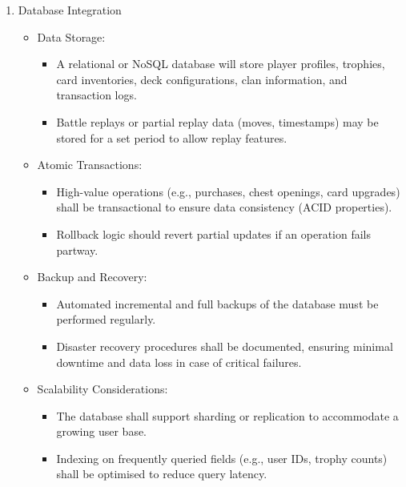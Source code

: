 \documentclass{article}
\begin{document}
\begin{enumerate}[label=\textbf{FR\arabic*:}]
    \item Database Integration
    \begin{itemize}
        \item Data Storage:
        \begin{itemize}
            \item A relational or NoSQL database will store player profiles, trophies, card inventories, deck configurations, clan information, and transaction logs.
            \item Battle replays or partial replay data (moves, timestamps) may be stored for a set period to allow replay features.
        \end{itemize}
        \item Atomic Transactions:
        \begin{itemize}
            \item High-value operations (e.g., purchases, chest openings, card upgrades) shall be transactional to ensure data consistency (ACID properties).
            \item Rollback logic should revert partial updates if an operation fails partway.
        \end{itemize}
        \item Backup and Recovery:
        \begin{itemize}
            \item Automated incremental and full backups of the database must be performed regularly.
            \item Disaster recovery procedures shall be documented, ensuring minimal downtime and data loss in case of critical failures.
        \end{itemize}
        \item Scalability Considerations:
        \begin{itemize}
            \item The database shall support sharding or replication to accommodate a growing user base.
            \item Indexing on frequently queried fields (e.g., user IDs, trophy counts) shall be optimised to reduce query latency.
        \end{itemize}
    \end{itemize}
\end{enumerate}

\newpage
\end{document}
